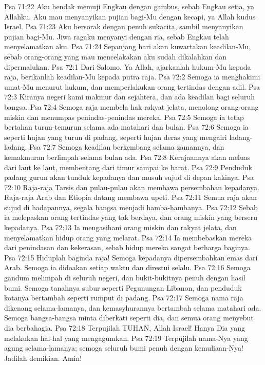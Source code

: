 Psa 71:22  Aku hendak memuji Engkau dengan gambus, sebab Engkau setia, ya Allahku. Aku mau menyanyikan pujian bagi-Mu dengan kecapi, ya Allah kudus Israel.
Psa 71:23  Aku bersorak dengan penuh sukacita, sambil menyanyikan pujian bagi-Mu. Jiwa ragaku menyanyi dengan ria, sebab Engkau telah menyelamatkan aku.
Psa 71:24  Sepanjang hari akan kuwartakan keadilan-Mu, sebab orang-orang yang mau mencelakakan aku sudah dikalahkan dan dipermalukan.
Psa 72:1  Dari Salomo. Ya Allah, ajarkanlah hukum-Mu kepada raja, berikanlah keadilan-Mu kepada putra raja.
Psa 72:2  Semoga ia menghakimi umat-Mu menurut hukum, dan memperlakukan orang tertindas dengan adil.
Psa 72:3  Kiranya negeri kami makmur dan sejahtera, dan ada keadilan bagi seluruh bangsa.
Psa 72:4  Semoga raja membela hak rakyat jelata, menolong orang-orang miskin dan menumpas penindas-penindas mereka.
Psa 72:5  Semoga ia tetap bertahan turun-temurun selama ada matahari dan bulan.
Psa 72:6  Semoga ia seperti hujan yang turun di padang, seperti hujan deras yang mengairi ladang-ladang.
Psa 72:7  Semoga keadilan berkembang selama zamannya, dan kemakmuran berlimpah selama bulan ada.
Psa 72:8  Kerajaannya akan meluas dari laut ke laut, membentang dari timur sampai ke barat.
Psa 72:9  Penduduk padang gurun akan tunduk kepadanya dan musuh sujud di depan kakinya.
Psa 72:10  Raja-raja Tarsis dan pulau-pulau akan membawa persembahan kepadanya. Raja-raja Arab dan Etiopia datang membawa upeti.
Psa 72:11  Semua raja akan sujud di hadapannya, segala bangsa menjadi hamba-hambanya.
Psa 72:12  Sebab ia melepaskan orang tertindas yang tak berdaya, dan orang miskin yang berseru kepadanya.
Psa 72:13  Ia mengasihani orang miskin dan rakyat jelata, dan menyelamatkan hidup orang yang melarat.
Psa 72:14  Ia membebaskan mereka dari penindasan dan kekerasan, sebab hidup mereka sangat berharga baginya.
Psa 72:15  Hiduplah baginda raja! Semoga kepadanya dipersembahkan emas dari Arab. Semoga ia didoakan setiap waktu dan direstui selalu.
Psa 72:16  Semoga gandum melimpah di seluruh negeri, dan bukit-bukitnya penuh dengan hasil bumi. Semoga tanahnya subur seperti Pegunungan Libanon, dan penduduk kotanya bertambah seperti rumput di padang.
Psa 72:17  Semoga nama raja dikenang selama-lamanya, dan kemasyhurannya bertambah selama matahari ada. Semoga bangsa-bangsa minta diberkati seperti dia, dan semua orang menyebut dia berbahagia.
Psa 72:18  Terpujilah TUHAN, Allah Israel! Hanya Dia yang melakukan hal-hal yang mengagumkan.
Psa 72:19  Terpujilah nama-Nya yang agung selama-lamanya; semoga seluruh bumi penuh dengan kemuliaan-Nya! Jadilah demikian. Amin!
